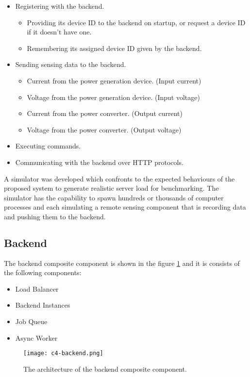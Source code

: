 \documentclass[../thesis.tex]{subfiles}
\begin{document}
\begin{itemize}
	\item Registering with the backend.
	\begin{itemize}
		\item Providing its device ID to the backend on startup, or request a device ID if it doesn't have one. 
		\item Remembering its assigned device ID given by the backend. 
	\end{itemize}
	\item Sending sensing data to the backend.
	\begin{itemize}
		\item Current from the power generation device. (Input current)
		\item Voltage from the power generation device. (Input voltage)
		\item Current from the power converter. (Output current)
		\item Voltage from the power converter. (Output voltage)
	\end{itemize}
	\item Executing commands.
	\item Communicating with the backend over HTTP protocols.
\end{itemize}

A simulator was developed which confronts to the expected behaviours of the proposed system to generate realistic server load for benchmarking. The simulator has the capability to spawn hundreds or thousands of computer processes and each simulating a remote sensing component that is recording data and pushing them to the backend.


\subsection{Backend}
\label{sec:backend}

The backend composite component is shown in the figure \ref{fig:backend} and it is consists of the following components:
\begin{itemize}
	\item Load Balancer
	\item Backend Instances
	\item Job Queue
	\item Async Worker
\end{itemize}


\begin{figure}[!ht]
	\centering
	\texttt{[image: c4-backend.png]}
	\caption{The architecture of the backend composite component.}
	\label{fig:backend}
\end{figure}
\end{document}
